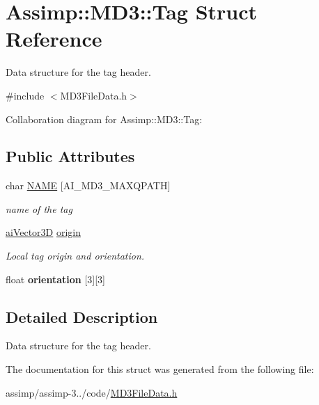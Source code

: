 \hypertarget{struct_assimp_1_1_m_d3_1_1_tag}{\section{Assimp\+:\+:M\+D3\+:\+:Tag Struct Reference}
\label{struct_assimp_1_1_m_d3_1_1_tag}
}


Data structure for the tag header.  




{\ttfamily \#include $<$M\+D3\+File\+Data.\+h$>$}



Collaboration diagram for Assimp\+:\+:M\+D3\+:\+:Tag\+:
\subsection*{Public Attributes}
\begin{DoxyCompactItemize}
\item 
\hypertarget{struct_assimp_1_1_m_d3_1_1_tag_a9690e3b0286f23acd1174a0f1836cbf8}{char \hyperlink{struct_assimp_1_1_m_d3_1_1_tag_a9690e3b0286f23acd1174a0f1836cbf8}{N\+A\+M\+E} \mbox{[}A\+I\+\_\+\+M\+D3\+\_\+\+M\+A\+X\+Q\+P\+A\+T\+H\mbox{]}}\label{struct_assimp_1_1_m_d3_1_1_tag_a9690e3b0286f23acd1174a0f1836cbf8}

\begin{DoxyCompactList}\small\item\em name of the tag \end{DoxyCompactList}\item 
\hypertarget{struct_assimp_1_1_m_d3_1_1_tag_a264410e1a5b4c0b66894c23a9550c364}{\hyperlink{structai_vector3_d}{ai\+Vector3\+D} \hyperlink{struct_assimp_1_1_m_d3_1_1_tag_a264410e1a5b4c0b66894c23a9550c364}{origin}}\label{struct_assimp_1_1_m_d3_1_1_tag_a264410e1a5b4c0b66894c23a9550c364}

\begin{DoxyCompactList}\small\item\em Local tag origin and orientation. \end{DoxyCompactList}\item 
\hypertarget{struct_assimp_1_1_m_d3_1_1_tag_a48c6df62543e70ed4ae8f9e94d662d9b}{float {\bfseries orientation} \mbox{[}3\mbox{]}\mbox{[}3\mbox{]}}\label{struct_assimp_1_1_m_d3_1_1_tag_a48c6df62543e70ed4ae8f9e94d662d9b}

\end{DoxyCompactItemize}


\subsection{Detailed Description}
Data structure for the tag header. 

The documentation for this struct was generated from the following file\+:\begin{DoxyCompactItemize}
\item 
assimp/assimp-\/3../code/\hyperlink{_m_d3_file_data_8h}{M\+D3\+File\+Data.\+h}\end{DoxyCompactItemize}
